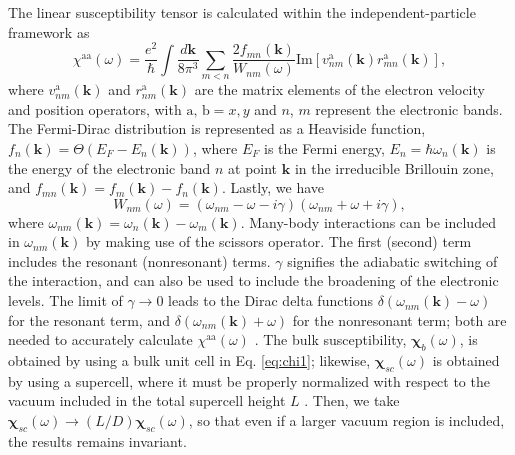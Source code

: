 \documentclass[aps,prb,10pt,showkeys,letterpaper,notitlepage,twocolumn]{revtex4-1}
\begin{document}
The linear susceptibility tensor is calculated within the independent-particle
framework as
\begin{equation}\label{eq:chi1}
\chi^{\mathrm{aa}}(\omega) =
\frac{e^{2}}{\hbar}
\int\frac{d\mathbf{k}}{8\pi^{3}}
\sum_{m<n}\frac{2f_{mn}(\mathbf{k})}{W_{nm}(\omega)}
\mathrm{Im}
\left[
v^{\mathrm{a}}_{nm}(\mathbf{k})r^{\mathrm{a}}_{mn}(\mathbf{k})
\right],
\end{equation}
where $v^{\mathrm{a}}_{nm}(\mathbf{k})$ and $r^{\mathrm{a}}_{nm}(\mathbf{k})$
are the matrix elements of the electron velocity and position operators, with
$\mathrm{a,\,b} = x,y$ and $n$, $m$ represent the electronic bands. The
Fermi-Dirac distribution is represented as a Heaviside function,
$f_{n}(\mathbf{k}) = \Theta\left(E_{F} - E_{n}(\mathbf{k})\right)$, where
$E_{F}$ is the Fermi energy, $E_{n} = \hbar \omega_{n}(\mathbf{k})$ is the
energy of the electronic band $n$ at point $\mathbf{k}$ in the irreducible
Brillouin zone, and $f_{mn}(\mathbf{k}) = f_{m}(\mathbf{k}) -
f_{n}(\mathbf{k})$. Lastly, we have
\begin{equation*}\label{eq:wnm}
W_{nm}(\omega) =
(\omega_{nm} - \omega - i\gamma)
(\omega_{nm} + \omega + i\gamma),
\end{equation*}
where $\omega_{nm}(\mathbf{k}) = \omega_{n}(\mathbf{k}) -
\omega_{m}(\mathbf{k})$. Many-body interactions can be included in
$\omega_{nm}(\mathbf{k})$ by making use of the scissors operator. The first
(second) term includes the resonant (nonresonant) terms. $\gamma$ signifies the
adiabatic switching of the interaction, and can also be used to include the
broadening of the electronic levels. The limit of $\gamma\to 0$ leads to the
Dirac delta functions $\delta(\omega_{nm}(\mathbf{k}) - \omega)$ for the
resonant term, and $\delta(\omega_{nm}(\mathbf{k}) + \omega)$ for the
nonresonant term; both are needed to accurately calculate
$\chi^{\mathrm{aa}}(\omega)$ \cite{tancognePRB14}. The bulk susceptibility,
$\boldsymbol{\chi}^{~}_{b}(\omega)$, is obtained by using a bulk unit cell in
Eq. \eqref{eq:chi1}; likewise, $\boldsymbol{\chi}_{sc}(\omega)$ is obtained by
using a supercell, where it must be properly normalized with respect to the
vacuum included in the total supercell height $L$ \cite{tancognePRB15}. Then, we
take $\boldsymbol{\chi}_{sc}(\omega)\to(L/D)\boldsymbol{\chi}_{sc}(\omega)$, so
that even if a larger vacuum region is included, the results remains invariant.

\end{document}
